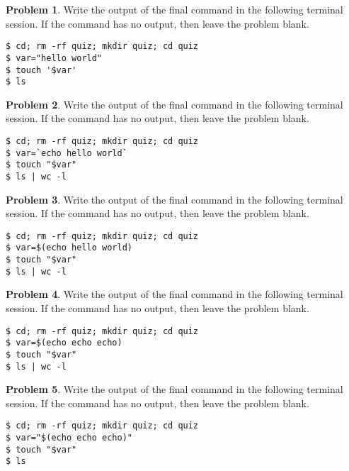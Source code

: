 \documentclass[10pt]{article}
\theoremstyle{definition}
\newtheorem{problem}{Problem}
\begin{document}
\filbreak\begin{problem}
    Write the output of the final command in the following terminal session.
    If the command has no output, then leave the problem blank.
\end{problem}
\begin{lstlisting}
$ cd; rm -rf quiz; mkdir quiz; cd quiz
$ var="hello world"
$ touch '$var'
$ ls
\end{lstlisting}
\vspace{0.4in}

\filbreak\begin{problem}
    Write the output of the final command in the following terminal session.
    If the command has no output, then leave the problem blank.
\end{problem}
\begin{lstlisting}
$ cd; rm -rf quiz; mkdir quiz; cd quiz
$ var=`echo hello world`
$ touch "$var"
$ ls | wc -l
\end{lstlisting}
\vspace{0.4in}

\filbreak\begin{problem}
    Write the output of the final command in the following terminal session.
    If the command has no output, then leave the problem blank.
\end{problem}
\begin{lstlisting}
$ cd; rm -rf quiz; mkdir quiz; cd quiz
$ var=$(echo hello world)
$ touch "$var"
$ ls | wc -l
\end{lstlisting}
\vspace{0.4in}

\filbreak\begin{problem}
    Write the output of the final command in the following terminal session.
    If the command has no output, then leave the problem blank.
\end{problem}
\begin{lstlisting}
$ cd; rm -rf quiz; mkdir quiz; cd quiz
$ var=$(echo echo echo)
$ touch "$var"
$ ls | wc -l
\end{lstlisting}
\vspace{0.4in}


\filbreak\begin{problem}
    Write the output of the final command in the following terminal session.
    If the command has no output, then leave the problem blank.
\end{problem}
\begin{lstlisting}
$ cd; rm -rf quiz; mkdir quiz; cd quiz
$ var="$(echo echo echo)"
$ touch "$var"
$ ls
\end{lstlisting}
\vspace{0.4in}
\end{document}
